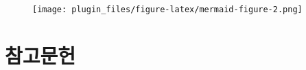 \documentclass[
  letterpaper,
]{book}
\begin{document}
\begin{figure}[H]

{\centering \texttt{[image: plugin\_files/figure-latex/mermaid-figure-2.png]}

}

\end{figure}


\hypertarget{uxcc38uxace0uxbb38uxd5cc-2}{%
\chapter*{참고문헌}\label{uxcc38uxace0uxbb38uxd5cc-2}}


\printbibliography[heading=none]


\backmatter


\printindex
\end{document}
